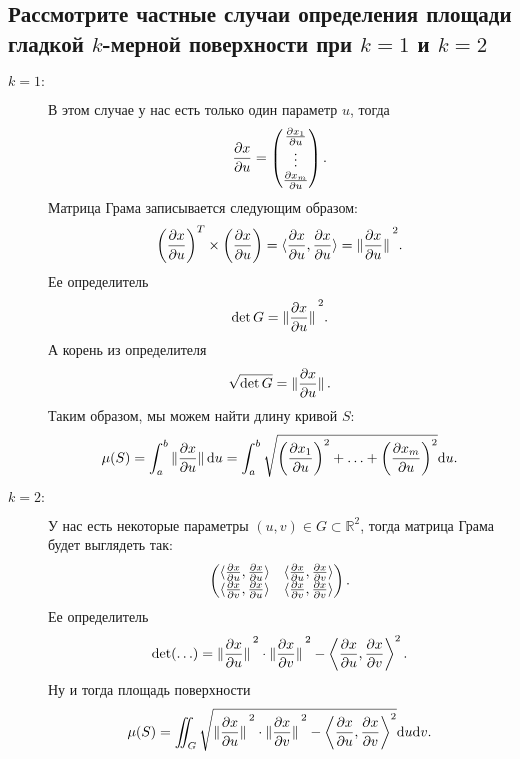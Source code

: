 
\subsection{Рассмотрите частные случаи определения площади гладкой $k$-мерной поверхности при $k = 1$ и $k = 2$}

\begin{description}
    \item[$k = 1 \colon$] В этом случае у нас есть только один параметр $u$, тогда
    \[
        \pdv{x}{u} = \begin{pmatrix}
            \pdv{x_{1}}{u} \\
            \vdots \\
            \pdv{x_{m}}{u}
        \end{pmatrix}.
    \]
    Матрица Грама записывается следующим образом:
    \[
        \pqty{\pdv{x}{u}}^{T} \times \pqty{\pdv{x}{u}} = \langle \pdv{x}{u}, \pdv{x}{u} \rangle = \norm{\pdv{x}{u}}^{2}.
    \]
    Ее определитель
    \[
        \det G = \norm{\pdv{x}{u}}^{2}.
    \]
    А корень из определителя
    \[
        \sqrt{\det G} = \norm{\pdv{x}{u}}.
    \]
    Таким образом, мы можем найти длину кривой $S$:
    \[
        \mu(S) = \int_{a}^{b} \norm{\pdv{x}{u}} \dd u = \int_{a}^{b} \sqrt{\pqty{\pdv{x_{1}}{u}}^{2} + \ldots + \pqty{\pdv{x_{m}}{u}}^{2}} \dd u.
    \]
    \item[$k = 2 \colon$] У нас есть некоторые параметры $(u, v) \in G \subset \mathbb{R}^{2}$, тогда матрица Грама будет выглядеть так:
    \[
        \begin{pmatrix}
            \langle \pdv{x}{u}, \pdv{x}{u} \rangle & \langle \pdv{x}{u}, \pdv{x}{v} \rangle \\
            \langle \pdv{x}{v}, \pdv{x}{u} \rangle & \langle \pdv{x}{v}, \pdv{x}{v} \rangle
        \end{pmatrix}.
    \]
    Ее определитель
    \[
        \det(\ldots) = \norm{\pdv{x}{u}}^{2} \cdot \norm{\pdv{x}{v}} ^{2} - \left\langle \pdv{x}{u}, \pdv{x}{v} \right\rangle^{2}.
    \]
    Ну и тогда площадь поверхности
    \[
        \mu(S) = \iint_{G} \sqrt{\norm{\pdv{x}{u}}^{2} \cdot \norm{\pdv{x}{v}} ^{2} - \left\langle \pdv{x}{u}, \pdv{x}{v} \right\rangle^{2}} \dd u \dd v.
    \]
\end{description}

